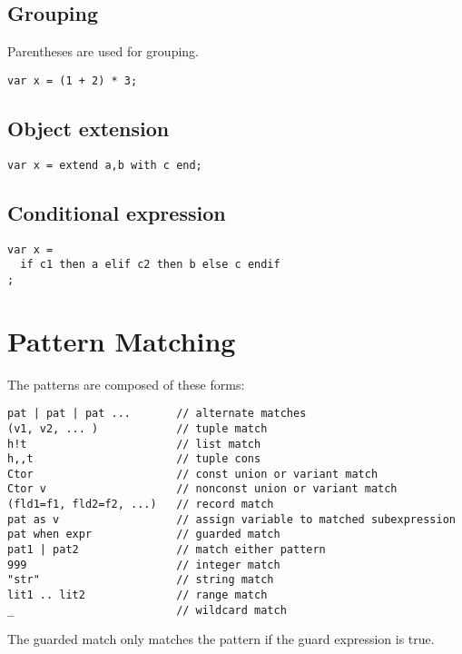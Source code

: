 \documentclass[oneside]{book}
\begin{document}
\section{Grouping}
Parentheses are used for grouping.

\begin{verbatim}
var x = (1 + 2) * 3;
\end{verbatim}


\section{Object extension}

\begin{verbatim}
var x = extend a,b with c end;
\end{verbatim}


\section{Conditional expression}

\begin{verbatim}
var x =
  if c1 then a elif c2 then b else c endif
;
\end{verbatim}

\chapter{Pattern Matching}\label{Pattern Matching}
The patterns
are composed of these forms:

\begin{verbatim}
pat | pat | pat ...       // alternate matches
(v1, v2, ... )            // tuple match
h!t                       // list match
h,,t                      // tuple cons
Ctor                      // const union or variant match
Ctor v                    // nonconst union or variant match
(fld1=f1, fld2=f2, ...)   // record match
pat as v                  // assign variable to matched subexpression
pat when expr             // guarded match
pat1 | pat2               // match either pattern
999                       // integer match
"str"                     // string match 
lit1 .. lit2              // range match
_                         // wildcard match
\end{verbatim}


The guarded match only matches the pattern if the guard expression is true.
\end{document}
